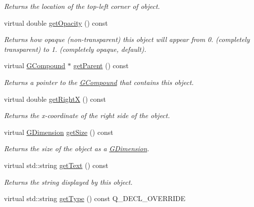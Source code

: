\begin{DoxyCompactItemize}
\begin{DoxyCompactList}\small\item\em Returns the location of the top-\/left corner of object. \end{DoxyCompactList}\item 
virtual double \mbox{\hyperlink{classGObject_a1ae3fc278cc5b71b9f2d96a8a83cdf26}{get\+Opacity}} () const
\begin{DoxyCompactList}\small\item\em Returns how opaque (non-\/transparent) this object will appear from 0. (completely transparent) to 1. (completely opaque, default). \end{DoxyCompactList}\item 
virtual \mbox{\hyperlink{classGCompound}{G\+Compound}} $\ast$ \mbox{\hyperlink{classGObject_a3e53cef70541b1a14eade4ad0984d0b4}{get\+Parent}} () const
\begin{DoxyCompactList}\small\item\em Returns a pointer to the {\ttfamily \mbox{\hyperlink{classGCompound}{G\+Compound}}} that contains this object. \end{DoxyCompactList}\item 
virtual double \mbox{\hyperlink{classGObject_a798cc79daaa10145b28f60bcdfdb0ee9}{get\+RightX}} () const
\begin{DoxyCompactList}\small\item\em Returns the {\itshape x}-\/coordinate of the right side of the object. \end{DoxyCompactList}\item 
virtual \mbox{\hyperlink{classGDimension}{G\+Dimension}} \mbox{\hyperlink{classGObject_a7b4eec96a2bdc6420695d5796a78eea9}{get\+Size}} () const
\begin{DoxyCompactList}\small\item\em Returns the size of the object as a {\ttfamily \mbox{\hyperlink{classGDimension}{G\+Dimension}}}. \end{DoxyCompactList}\item 
virtual std\+::string \mbox{\hyperlink{classGText_aff553c50924b836c29f146ed34a7c6ec}{get\+Text}} () const
\begin{DoxyCompactList}\small\item\em Returns the string displayed by this object. \end{DoxyCompactList}\item 
virtual std\+::string \mbox{\hyperlink{classGText_a9896d58fcfebbf1025aeeb5b8b9ede80}{get\+Type}} () const Q\+\_\+\+D\+E\+C\+L\+\_\+\+O\+V\+E\+R\+R\+I\+DE

\end{DoxyCompactItemize}
